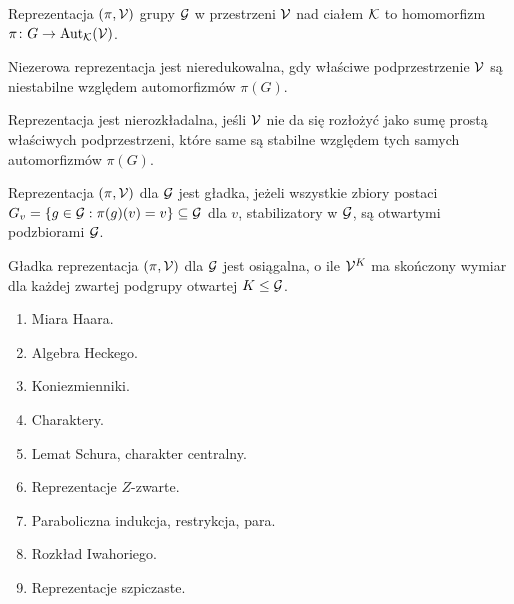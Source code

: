 
\begin{definicja}
	{Reprezentacja} $(\pi, \mathcal V)$ grupy $\mathcal G$ w przestrzeni $\mathcal V$ nad ciałem $\mathcal K$ to homomorfizm $\pi \colon G \to \textrm{Aut}_{\mathcal K}(\mathcal V)$.
\end{definicja}

\begin{definicja}
	Niezerowa reprezentacja jest {nieredukowalna}, gdy właściwe podprzestrzenie $\mathcal V$ są niestabilne względem automorfizmów $\pi(G)$.
\end{definicja}

\begin{definicja}
	Reprezentacja jest {nierozkładalna}, jeśli $\mathcal V$ nie da się rozłożyć jako sumę prostą właściwych podprzestrzeni, które same są stabilne względem tych samych automorfizmów $\pi(G)$.
\end{definicja}

\begin{definicja}
	Reprezentacja $(\pi, \mathcal V)$ dla $\mathcal G$ jest {gładka}, jeżeli wszystkie zbiory postaci $G_v = \{g \in \mathcal G : \pi(g)(v) = v\} \subseteq \mathcal G$ dla $v$, stabilizatory w $\mathcal G$, są otwartymi podzbiorami $\mathcal G$.
\end{definicja}


\begin{definicja}
	Gładka reprezentacja $(\pi, \mathcal V)$ dla $\mathcal G$ jest {osiągalna}, o ile $\mathcal V^K$ ma skończony wymiar dla każdej zwartej podgrupy otwartej $K \le \mathcal G$.
\end{definicja}

\begin{enumerate}
\item Miara Haara. 
\item Algebra Heckego. 
\item Koniezmienniki. 
\item Charaktery. 
\item Lemat Schura, charakter centralny. 
\item Reprezentacje $Z$-zwarte. 
\item Paraboliczna indukcja, restrykcja, para.
\item Rozkład Iwahoriego. 
\item Reprezentacje szpiczaste. 
\end{enumerate}

